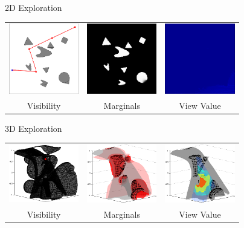 \addtocounter{framenumber}{-1}
\begin{tframe}{2D Exploration}
\begin{center}

\bigskip
\begin{tabular}{ccc}
\includegraphics[width=1.2in]{media_exploration/2D_scene_05}&
\includegraphics[width=1.2in]{media_exploration/2D_marginal_05}&
\includegraphics[width=1.2in]{media_exploration/2D_energy_05}
\\ Visibility & Marginals & View Value
\end{tabular}
\end{center}
\end{tframe}

\begin{tframe}{3D Exploration}
\begin{center}

\bigskip
\begin{tabular}{ccc}
\includegraphics[width=1.2in]{media_exploration/view_01}&
\includegraphics[width=1.2in]{media_exploration/marginal_01}&
\includegraphics[width=1.2in]{media_exploration/energy_01}
\\ Visibility & Marginals & View Value
\end{tabular}
\end{center}
\end{tframe}

